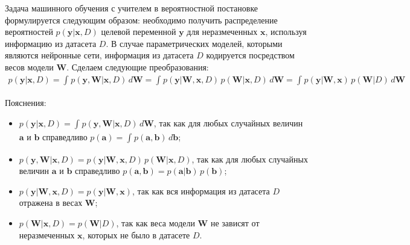 \documentclass{article}
\numberwithin{equation}{section}
\begin{document}
    Задача машинного обучения с учителем
    в вероятностной постановке формулируется следующим образом:
    необходимо получить распределение вероятностей
    $p(\pmb{y} | \pmb{x}, D)$
    целевой переменной $\pmb{y}$
    для неразмеченных $\pmb{x}$, используя информацию из датасета $D$.
    В случае параметрических моделей, которыми являются нейронные сети,
    информация из датасета $D$ кодируется посредством весов модели $\pmb{W}$.
    Сделаем следующие преобразования:
    \begin{equation}\label{pred_distribution}
    \begin{split}
        p(\pmb{y} | \pmb{x}, D)
        =
        \int_{}{
            p(\pmb{y}, \pmb{W} | \pmb{x}, D)
            \,
            d\pmb{W}
        }
        =
        \int_{}{
            p(\pmb{y} | \pmb{W}, \pmb{x}, D)
            \,
            p(\pmb{W} | \pmb{x}, D)
            \,
            d\pmb{W}
        }
        =
        \int_{}{
            p(\pmb{y} | \pmb{W}, \pmb{x})
            \,
            p(\pmb{W} | D)
            \,
            d\pmb{W}
        }
    \end{split}
    \end{equation}

    Пояснения:
    \begin{itemize}
    \item
        $
            p(\pmb{y} | \pmb{x}, D)
            =
            \int_{}{
                p(\pmb{y}, \pmb{W} | \pmb{x}, D)
                \,
                d\pmb{W}
            }
        $, так как для любых случайных величин
        $\pmb{a}$ и $\pmb{b}$ справедливо
        $
            p(\pmb{a})
            =
            \int_{}{
                p(\pmb{a}, \pmb{b})
                \,
                d\pmb{b}
            }
        $;
    \item
        $
            p(\pmb{y}, \pmb{W} | \pmb{x}, D)
            =
            p(\pmb{y} | \pmb{W}, \pmb{x}, D)
            \,
            p(\pmb{W} | \pmb{x}, D)
        $, так как для любых случайных величин $\pmb{a}$ и $\pmb{b}$ справедливо
        $
            p(\pmb{a}, \pmb{b})
            =
            p(\pmb{a}| \pmb{b})
            \,
            p(\pmb{b})
        $;
    \item
        $
            p(\pmb{y} | \pmb{W}, \pmb{x}, D)
            =
            p(\pmb{y} | \pmb{W}, \pmb{x})
        $, так как вся информация из датасета $D$ отражена в весах $\pmb{W}$;
    \item
        $
            p(\pmb{W} | \pmb{x}, D)
            =
            p(\pmb{W} | D)
        $, так как веса модели $\pmb{W}$ не зависят от неразмеченных
        $\pmb{x}$, которых не было в датасете $D$.
    \end{itemize}
\end{document}
